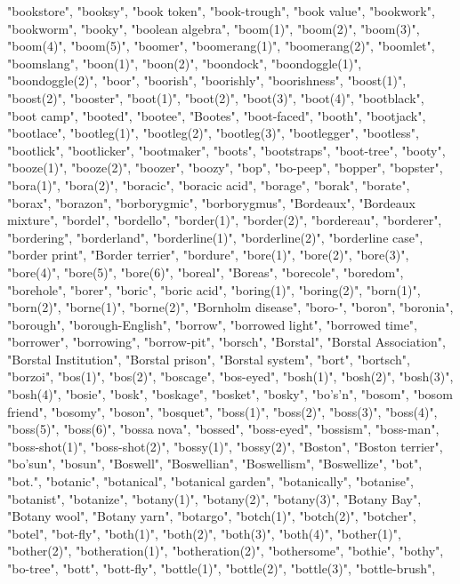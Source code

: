 "bookstore",
"booksy",
"book token",
"book-trough",
"book value",
"bookwork",
"bookworm",
"booky",
"boolean algebra",
"boom(1)",
"boom(2)",
"boom(3)",
"boom(4)",
"boom(5)",
"boomer",
"boomerang(1)",
"boomerang(2)",
"boomlet",
"boomslang",
"boon(1)",
"boon(2)",
"boondock",
"boondoggle(1)",
"boondoggle(2)",
"boor",
"boorish",
"boorishly",
"boorishness",
"boost(1)",
"boost(2)",
"booster",
"boot(1)",
"boot(2)",
"boot(3)",
"boot(4)",
"bootblack",
"boot camp",
"booted",
"bootee",
"Bootes",
"boot-faced",
"booth",
"bootjack",
"bootlace",
"bootleg(1)",
"bootleg(2)",
"bootleg(3)",
"bootlegger",
"bootless",
"bootlick",
"bootlicker",
"bootmaker",
"boots",
"bootstraps",
"boot-tree",
"booty",
"booze(1)",
"booze(2)",
"boozer",
"boozy",
"bop",
"bo-peep",
"bopper",
"bopster",
"bora(1)",
"bora(2)",
"boracic",
"boracic acid",
"borage",
"borak",
"borate",
"borax",
"borazon",
"borborygmic",
"borborygmus",
"Bordeaux",
"Bordeaux mixture",
"bordel",
"bordello",
"border(1)",
"border(2)",
"bordereau",
"borderer",
"bordering",
"borderland",
"borderline(1)",
"borderline(2)",
"borderline case",
"border print",
"Border terrier",
"bordure",
"bore(1)",
"bore(2)",
"bore(3)",
"bore(4)",
"bore(5)",
"bore(6)",
"boreal",
"Boreas",
"borecole",
"boredom",
"borehole",
"borer",
"boric",
"boric acid",
"boring(1)",
"boring(2)",
"born(1)",
"born(2)",
"borne(1)",
"borne(2)",
"Bornholm disease",
"boro-",
"boron",
"boronia",
"borough",
"borough-English",
"borrow",
"borrowed light",
"borrowed time",
"borrower",
"borrowing",
"borrow-pit",
"borsch",
"Borstal",
"Borstal Association",
"Borstal Institution",
"Borstal prison",
"Borstal system",
"bort",
"bortsch",
"borzoi",
"bos(1)",
"bos(2)",
"boscage",
"bos-eyed",
"bosh(1)",
"bosh(2)",
"bosh(3)",
"bosh(4)",
"bosie",
"bosk",
"boskage",
"bosket",
"bosky",
"bo's'n",
"bosom",
"bosom friend",
"bosomy",
"boson",
"bosquet",
"boss(1)",
"boss(2)",
"boss(3)",
"boss(4)",
"boss(5)",
"boss(6)",
"bossa nova",
"bossed",
"boss-eyed",
"bossism",
"boss-man",
"boss-shot(1)",
"boss-shot(2)",
"bossy(1)",
"bossy(2)",
"Boston",
"Boston terrier",
"bo'sun",
"bosun",
"Boswell",
"Boswellian",
"Boswellism",
"Boswellize",
"bot",
"bot.",
"botanic",
"botanical",
"botanical garden",
"botanically",
"botanise",
"botanist",
"botanize",
"botany(1)",
"botany(2)",
"botany(3)",
"Botany Bay",
"Botany wool",
"Botany yarn",
"botargo",
"botch(1)",
"botch(2)",
"botcher",
"botel",
"bot-fly",
"both(1)",
"both(2)",
"both(3)",
"both(4)",
"bother(1)",
"bother(2)",
"botheration(1)",
"botheration(2)",
"bothersome",
"bothie",
"bothy",
"bo-tree",
"bott",
"bott-fly",
"bottle(1)",
"bottle(2)",
"bottle(3)",
"bottle-brush",
